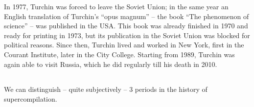 In 1977, Turchin was forced to leave the Soviet Union;
in the same year an English translation of Turchin's ``opus magnum'' 
-- the book ``The phenomenon of science'' --
was published in the USA\@. This book was already finished in 1970
and ready for printing in 1973, but its publication in the Soviet Union
was blocked for political reasons.
Since then, Turchin lived and worked in New York, first in the Courant Institute,
later in the City College.
Starting from 1989, Turchin was again able to visit Russia, which
he did regularly till his death in 2010.


\begin{center}\begin{tabular*}{.5\textwidth}{c}\hline\end{tabular*}\end{center}

We can distinguish -- quite subjectively -- 3 periods in the history 
of supercompilation.

